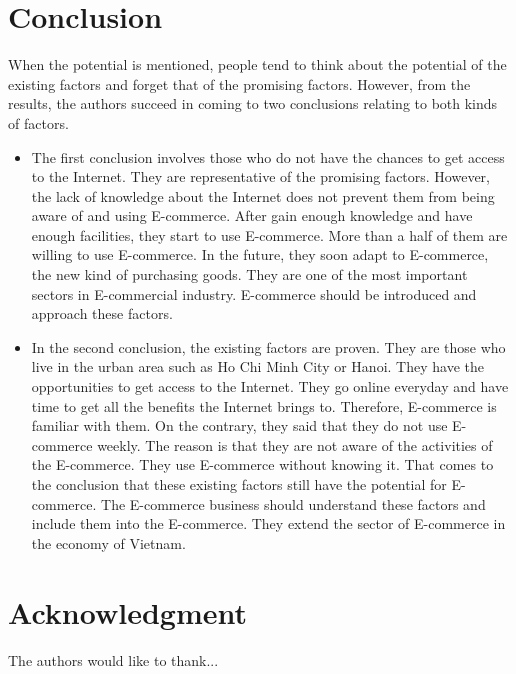 \documentclass[conference]{IEEEtran}
\begin{document}
\section{Conclusion} \label{conclusion}
When the potential is mentioned, people tend to think about the potential of the existing factors and forget that of the promising factors. However, from the results, the authors succeed in coming to two conclusions relating to both kinds of factors.

\begin{itemize}
\item The first conclusion involves those who do not have the chances to get access to the Internet. They are representative of the promising factors. However, the lack of knowledge about the Internet does not prevent them from being aware of and using E-commerce. After gain enough knowledge and have enough facilities, they start to use E-commerce. More than a half of them are willing to use E-commerce. In the future, they soon adapt to E-commerce, the new kind of purchasing goods. They are one of the most important sectors in E-commercial industry. E-commerce should be introduced and approach these factors.
\item In the second conclusion, the existing factors are proven. They are those who live in the urban area such as Ho Chi Minh City or Hanoi. They have the opportunities to get access to the Internet. They go online everyday and have time to get all the benefits the Internet brings to. Therefore, E-commerce is familiar with them. On the contrary, they said that they do not use E-commerce weekly. The reason is that they are not aware of the activities of the E-commerce. They use E-commerce without knowing it. That comes to the conclusion that these existing factors still have the potential for E-commerce. The E-commerce business should understand these factors and include them into the E-commerce. They extend the sector of E-commerce in the economy of Vietnam.

\end{itemize}






\section*{Acknowledgment}


The authors would like to thank...
\end{document}
